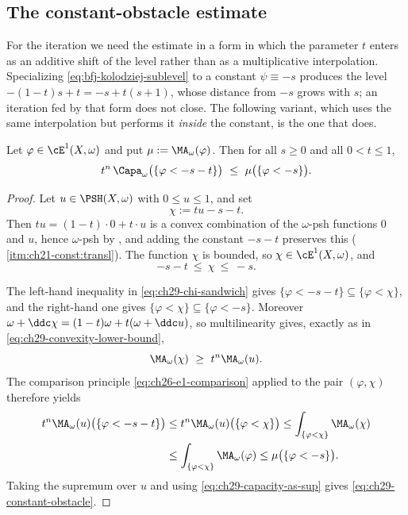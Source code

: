 \subsection{The constant-obstacle estimate}
\label{sec:ch29-constant-obstacle}

For the iteration we need the estimate in a form in which the parameter
$t$ enters as an additive shift of the level rather than as a
multiplicative interpolation.  Specializing
\eqref{eq:bfj-kolodziej-sublevel} to a constant $\psi\equiv-s$ produces
the level $-(1-t)s+t=-s+t(s+1)$, whose distance from $-s$ grows with
$s$; an iteration fed by that form does not close.  The following
variant, which uses the same interpolation but performs it \emph{inside} the
constant, is the one that does.

\begin{proposition}
\label{prop:ch29-constant-obstacle}
Let $\varphi\in\cE^1(X,\omega)$ and put $\mu:=\MA_\omega(\varphi)$.
Then for all $s\geq0$ and all $0<t\leq1$,
\begin{equation}
\label{eq:ch29-constant-obstacle}
 t^n\,\Capa_\omega\bigl(\{\varphi<-s-t\}\bigr)
 \ \leq\ \mu\bigl(\{\varphi<-s\}\bigr).
\end{equation}
\end{proposition}

\begin{proof}
Let $u\in\PSH(X,\omega)$ with $0\leq u\leq1$, and set
\[
 \chi:=tu-s-t .
\]
Then $tu=(1-t)\cdot0+t\cdot u$ is a convex combination of the
$\omega$-psh functions $0$ and $u$, hence $\omega$-psh by
, and adding the constant $-s-t$ preserves this
(\,\cref{itm:ch21-const:transl}).  The function
$\chi$ is bounded, so $\chi\in\cE^1(X,\omega)$, and
\begin{equation}
\label{eq:ch29-chi-sandwich}
 -s-t\ \leq\ \chi\ \leq\ -s .
\end{equation}

The left-hand inequality in \eqref{eq:ch29-chi-sandwich} gives
$\{\varphi<-s-t\}\subseteq\{\varphi<\chi\}$, and the right-hand one gives
$\{\varphi<\chi\}\subseteq\{\varphi<-s\}$.  Moreover
$\omega+\ddc\chi=(1-t)\omega+t(\omega+\ddc u)$, so multilinearity gives,
exactly as in \eqref{eq:ch29-convexity-lower-bound},
\[
 \MA_\omega(\chi)\ \geq\ t^n\MA_\omega(u).
\]
The comparison principle \eqref{eq:ch26-e1-comparison} applied to the pair
$(\varphi,\chi)$ therefore yields
\[
\begin{aligned}
 t^n\MA_\omega(u)\bigl(\{\varphi<-s-t\}\bigr)
 &\leq t^n\MA_\omega(u)\bigl(\{\varphi<\chi\}\bigr)
  \leq\int_{\{\varphi<\chi\}}\MA_\omega(\chi)\\
 &\leq\int_{\{\varphi<\chi\}}\MA_\omega(\varphi)
  \leq\mu\bigl(\{\varphi<-s\}\bigr).
\end{aligned}
\]
Taking the supremum over $u$ and using \eqref{eq:ch29-capacity-as-sup}
gives \eqref{eq:ch29-constant-obstacle}.
\end{proof}

